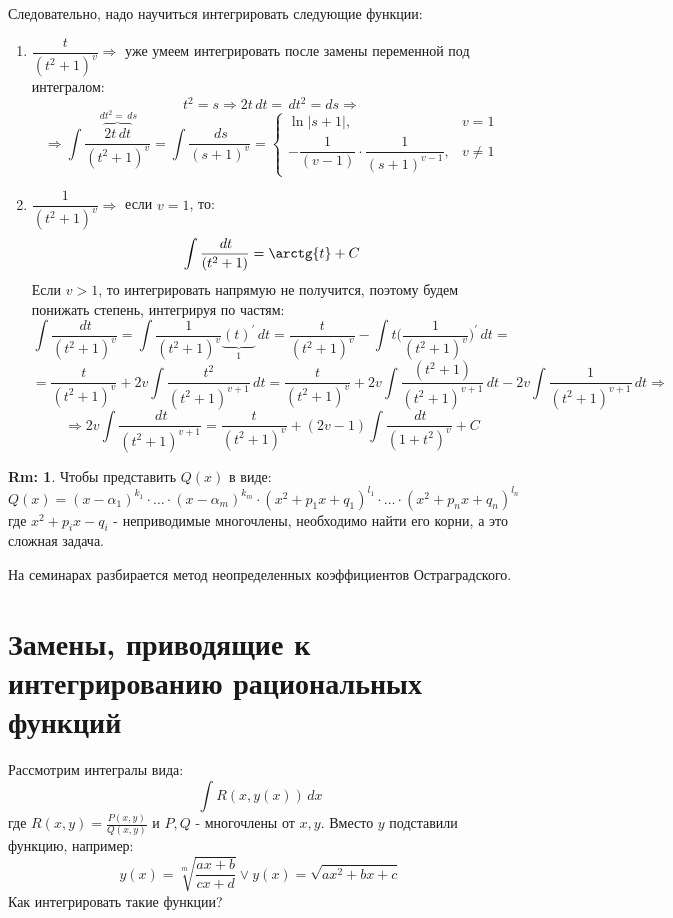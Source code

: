 \documentclass[12pt]{article}
\newcommand{\dd}{\, d}
\theoremstyle{definition}
\newtheorem{rem}{Rm:}
\DeclareMathOperator{\dint}{\displaystyle\int}
\begin{document}
\begin{enumerate}[label={(\arabic*)}]
\begin{enumerate}[label={(\Roman*)}]
$$		$$ 
		Следовательно, надо научиться интегрировать следующие функции:
		\begin{enumerate}[label={(\Alph*)}]
			\item $\dfrac{t}{(t^2 + 1)^v} \Rightarrow $ уже умеем интегрировать после замены переменной под интегралом: 
			$$
				t^2 = s \Rightarrow 2t \dd t = \dd t^2 = ds \Rightarrow
			$$
			$$
				\Rightarrow \dint \dfrac{\overbrace{2t \dd t}^{\dd t^2 = \dd s}}{(t^2 + 1)^v} = \dint \dfrac{\dd s}{(s + 1)^v} = 
			\begin{cases}
				\ln{|s+1|}, & v = 1\\
				-\dfrac{1}{(v-1)}{\cdot}\dfrac{1}{(s+1)^{v-1}}, & v \neq 1
			\end{cases}
			$$
			\item $\dfrac{1}{(t^2+ 1)^v} \Rightarrow $ если $v = 1$, то: 
			$$ 
				\dint \dfrac{\dd t}{(t^2+ 1)} = \arctg{t} + C
			$$ 
			Если $v > 1$, то интегрировать напрямую не получится, поэтому будем понижать степень, интегрируя по частям:
			$$
				\dint \dfrac{\dd t}{(t^2+ 1)^v} = \dint \dfrac{1}{(t^2+ 1)^v}\underbrace{(t)^\prime}_{1}\dd t = \dfrac{t}{(t^2 + 1)^v} - \dint t\bigg(\dfrac{1}{(t^2+ 1)^v} \bigg)^\prime \dd t = 
			$$
			$$
				= \dfrac{t}{(t^2 + 1)^v} + 2v \dint \dfrac{t^2}{(t^2+ 1)^{v+1}}  \dd t = \dfrac{t}{(t^2 + 1)^v} + 2v \dint \dfrac{(t^2 + 1)}{(t^2+ 1)^{v+1}}\dd t -2v \dint\dfrac{1}{(t^2+ 1)^{v+1}}  \dd t \Rightarrow
			$$
			$$
				\Rightarrow 2v \dint\dfrac{\dd t}{(t^2+ 1)^{v+1}} = \dfrac{t}{(t^2+1)^v} + (2v - 1)\dint \dfrac{\dd t}{(1 + t^2)^v} + C
			$$
		\end{enumerate} 
	\end{enumerate}
\end{enumerate}

\begin{rem}
	Чтобы представить $Q(x)$ в виде: 
	$$
		Q(x) = (x - \alpha_1)^{k_1}\cdot\dotsc\cdot(x-\alpha_m)^{k_m}\cdot(x^2 + p_1 x + q_1)^{l_1} \cdot \dotsc \cdot (x^2 + p_n x + q_n)^{l_n}
	$$ 
	где $x^2 + p_i x - q_i$ - неприводимые многочлены, необходимо найти его корни, а это сложная задача.
\end{rem}
На семинарах разбирается метод неопределенных коэффициентов Остраградского.

\section*{Замены, приводящие к интегрированию рациональных функций}

Рассмотрим интегралы вида: 
$$
	\dint R(x,y(x)) \dd x
$$ 
где $R(x,y) = \tfrac{P(x,y)}{Q(x,y)}$ и $P,Q$ - многочлены от $x,y$. Вместо $y$ подставили функцию, например: 
$$
	y(x) = \sqrt[m]{\dfrac{ax + b}{cx + d}} \vee y(x) = \sqrt{ax^2 + bx + c}
$$ 
Как интегрировать такие функции?
\end{document}
